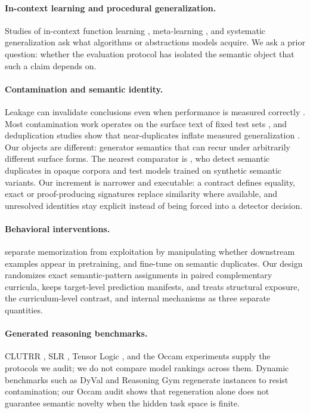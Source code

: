 \documentclass[twoside,11pt]{article}
\begin{document}
\paragraph{In-context learning and procedural generalization.}
Studies of in-context function learning
\citep{garg2022what,akyurek2023what,bhattamishra2024understanding},
meta-learning \citep{finn2017maml,vinyals2016matching}, and systematic
generalization \citep{lake2018generalization,chollet2019measure} ask what
algorithms or abstractions models acquire.  We ask a prior question:
whether the evaluation protocol has isolated the semantic object that such
a claim depends on.

\paragraph{Contamination and semantic identity.}
Leakage can invalidate conclusions even when performance is measured
correctly \citep{kapoor2023leakage}.  Most contamination work operates on
the surface text of fixed test sets
\citep{sainz2023nlp,xu2024contamination,golchin2024time,oren2024proving},
and deduplication studies show that near-duplicates inflate measured
generalization \citep{lee2022dedup,allamanis2019duplication}.  Our objects
are different: generator semantics that can recur under arbitrarily
different surface forms.  The nearest comparator is
\citet{spiesberger2026soft}, who detect semantic duplicates in opaque
corpora and test models trained on synthetic semantic variants.  Our
increment is narrower and executable: a contract defines equality, exact or
proof-producing signatures replace similarity where available, and
unresolved identities stay explicit instead of being forced into a detector
decision.

\paragraph{Behavioral interventions.}
\citet{magar2022data} separate memorization from exploitation by
manipulating whether downstream examples appear in pretraining, and
\citet{spiesberger2026soft} fine-tune on semantic duplicates.  Our design
randomizes exact semantic-pattern assignments in paired complementary
curricula, keeps target-level prediction manifests, and treats structural
exposure, the curriculum-level contrast, and internal mechanisms as three
separate quantities.

\paragraph{Generated reasoning benchmarks.}
CLUTRR \citep{sinha2019clutrr}, SLR \citep{helff2026slr}, Tensor Logic
\citep{shah2026tensorlogic}, and the Occam experiments
\citep{deora2025occam} supply the protocols we audit; we do not compare
model rankings across them.  Dynamic benchmarks such as DyVal
\citep{zhu2024dyval} and Reasoning Gym \citep{stojanovski2025reasoninggym}
regenerate instances to resist contamination; our Occam audit shows that
regeneration alone does not guarantee semantic novelty when the hidden task
space is finite.
\end{document}
